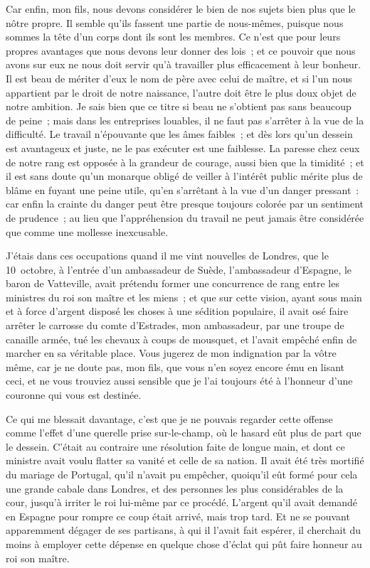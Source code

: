 \documentclass[french,twoside]{book} %
\begin{document}
Car enfin, mon fils, nous devons considérer le bien de nos sujets bien plus que le nôtre propre. Il semble qu’ils fassent une partie de nous-mêmes, puisque nous sommes la tête d’un corps dont ils sont les membres. Ce n’est que pour leurs propres avantages que nous devons leur donner des lois ; et ce pouvoir que nous avons sur eux ne nous doit servir qu’à travailler plus efficacement à leur bonheur. Il est beau de mériter d’eux le nom de père avec celui de maître, et si l’un nous appartient par le droit de notre naissance, l’autre doit être le plus doux objet de notre ambition. Je sais bien que ce titre si beau ne s’obtient pas sans beaucoup de peine ; mais dans les entreprises louables, il ne faut pas s’arrêter à la vue de la difficulté. Le travail n’épouvante que les âmes faibles ; et dès lors qu’un dessein est avantageux et juste, ne le pas exécuter est une faiblesse. La paresse chez ceux de notre rang est opposée à la grandeur de courage, aussi bien que la timidité ; et il est sans doute qu’un monarque obligé de veiller à l’intérêt public mérite plus de blâme en fuyant une peine utile, qu’en s’arrêtant à la vue d’un danger pressant : car enfin la crainte du danger peut être presque toujours colorée par un sentiment de prudence ; au lieu que l’appréhension du travail ne peut jamais être considérée que comme une mollesse inexcusable.\par
J’étais dans ces occupations quand il me vint nouvelles de Londres, que le 10 octobre, à l’entrée d’un ambassadeur de Suède, l’ambassadeur d’Espagne, le baron de Vatteville, avait prétendu former une concurrence de rang entre les ministres du roi son maître et les miens ; et que sur cette vision, ayant sous main et à force d’argent disposé les choses à une sédition populaire, il avait osé faire arrêter le carrosse du comte d’Estrades, mon ambassadeur, par une troupe de canaille armée, tué les chevaux à coups de mousquet, et l’avait empêché enfin de marcher en sa véritable place. Vous jugerez de mon indignation par la vôtre même, car je ne doute pas, mon fils, que vous n’en soyez encore ému en lisant ceci, et ne vous trouviez aussi sensible que je l’ai toujours été à l’honneur d’une couronne qui vous est destinée.\par
Ce qui me blessait davantage, c’est que je ne pouvais regarder cette offense comme l’effet d’une querelle prise sur-le-champ, où le hasard eût plus de part que le dessein. C’était au contraire une résolution faite de longue main, et dont ce ministre avait voulu flatter sa vanité et celle de sa nation. Il avait été très mortifié du mariage de Portugal, qu’il n’avait pu empêcher, quoiqu’il eût formé pour cela une grande cabale dans Londres, et des personnes les plus considérables de la cour, jusqu’à irriter le roi lui-même par ce procédé. L’argent qu’il avait demandé en Espagne pour rompre ce coup était arrivé, mais trop tard. Et ne se pouvant apparemment dégager de ses partisans, à qui il l’avait fait espérer, il cherchait du moins à employer cette dépense en quelque chose d’éclat qui pût faire honneur au roi son maître.\par
\end{document}
